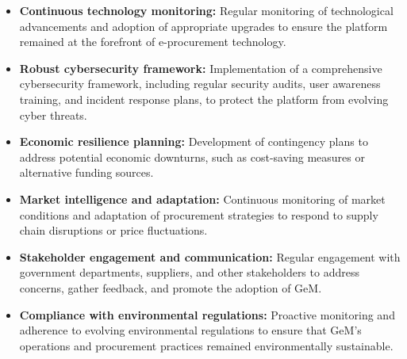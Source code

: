 \begin{itemize}
    \item \textbf{Continuous technology monitoring:} Regular monitoring of technological advancements and adoption of appropriate upgrades to ensure the platform remained at the forefront of e-procurement technology.
    \item \textbf{Robust cybersecurity framework:} Implementation of a comprehensive cybersecurity framework, including regular security audits, user awareness training, and incident response plans, to protect the platform from evolving cyber threats.
    \item \textbf{Economic resilience planning:} Development of contingency plans to address potential economic downturns, such as cost-saving measures or alternative funding sources.
    \item \textbf{Market intelligence and adaptation:} Continuous monitoring of market conditions and adaptation of procurement strategies to respond to supply chain disruptions or price fluctuations.
    \item \textbf{Stakeholder engagement and communication:} Regular engagement with government departments, suppliers, and other stakeholders to address concerns, gather feedback, and promote the adoption of GeM.
    \item \textbf{Compliance with environmental regulations:} Proactive monitoring and adherence to evolving environmental regulations to ensure that GeM's operations and procurement practices remained environmentally sustainable.
\end{itemize}


